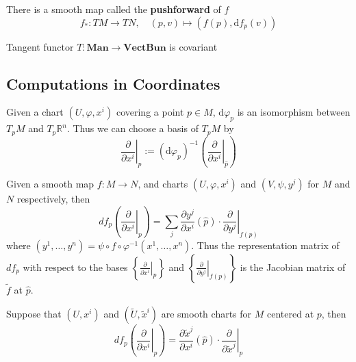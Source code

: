 \documentclass[12pt, oneside]{book}
\begin{document}
\begin{proposition}
    There is a smooth map called the \textbf{pushforward} of $f$
    \begin{equation*}
        f_*: T M \rightarrow T N ,\quad (p, v) \mapsto (f(p), \mathrm{d} f_p(v))
    \end{equation*}
\end{proposition}





\begin{proposition}
    Tangent functor $T: \mathbf{Man} \rightarrow \mathbf{VectBun}$ is covariant
\end{proposition}


\subsection{Computations in Coordinates} %

Given a chart $\left(U, \varphi, x^i\right)$ covering a point $p \in M$, $\mathrm{d}\varphi_p$ is an isomorphism between $T_p M$ and $T_p\mathbb{R}^n$.
Thus we can choose a basis of $T_p M$ by
\begin{equation*}
    \left.\frac{\partial}{\partial x^i}\right|_p
    :=
    (\mathrm{d}\varphi_p)^{-1}\left(\left.\frac{\partial}{\partial x^i}\right|_{\hat{p}}\right)
\end{equation*}


\begin{proposition}
    Given a smooth map $f: M \rightarrow N$, and charts $\left(U, \varphi, x^i\right)$ and $\left(V, \psi, y^j\right)$ for $M$ and $N$ respectively, then
    \begin{equation*}
        df_p \left(\left.\frac{\partial}{\partial x^i}\right|_p\right)
        =
        \sum_j\frac{\partial y^j}{\partial x^i}\left(\hat{p}\right)\cdot\left.\frac{\partial}{\partial y^j}\right|_{f(p)}
    \end{equation*}
    where $(y^1, \ldots, y^n)=\psi \circ f\circ \varphi^{-1}(x^1, \ldots, x^n)$.
    Thus the representation matrix of $df_p$ with respect to the bases $\left\{\left.\frac{\partial}{\partial x^i}\right|_p\right\}$ and $\left\{\left.\frac{\partial}{\partial y^j}\right|_{f(p)}\right\}$ is the Jacobian matrix of $\tilde{f}$ at $\hat{p}$.
\end{proposition}

\begin{corollary}
    Suppose that $\left(U,x^i\right)$ and $(\tilde{U},\tilde{x}^i)$ are smooth charts for $M$ centered at $p$, then
    \begin{equation*}
        df_p \left(\left.\frac{\partial}{\partial x^i}\right|_p\right)
        =
        \frac{\partial \tilde{x}^j}{\partial x^i}(\hat{p})\cdot \left.\frac{\partial}{\partial \tilde{x}^j}\right|_p
    \end{equation*}
\end{corollary}
\end{document}
